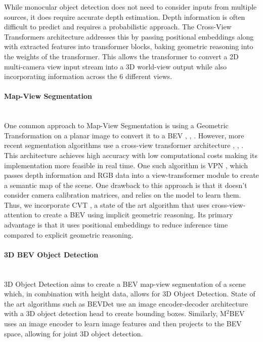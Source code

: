 \documentclass[a4paper,12pt]{article}
\newcommand{\sur}[1]{\ensuremath{^{\textrm{#1}}}} %
\begin{document}
\begin{multicols}{2}
While monocular object detection does not need to consider inputs from multiple sources, it does require accurate depth estimation. Depth information is often difficult to predict and requires a probabilistic approach.  The Cross-View Transformers architecture addresses this by passing positional embeddings along with extracted features into transformer blocks, baking geometric reasoning into the weights of the transformer. This allows the transformer to convert a 2D multi-camera view input stream into a 3D world-view output while also incorporating information across the 6 different views.

\paragraph{Map-View Segmentation}\mbox{}\\
One common approach to Map-View Segmentation is using a Geometric Transformation on a planar image to convert it to a BEV \cite{Geotrans}, \cite{GeoTrans2}, \cite{GeoTransform}. However, more recent segmentation algorithms use a cross-view transformer architecture \cite{VPN}, \cite{CVT}, \cite{BEVsemseg}. This architecture achieves high accuracy with low computational costs making its implementation more feasible in real time. One such algorithm is VPN \cite{VPN}, which passes depth information and RGB data into a view-transformer module to create a semantic map of the scene. One drawback to this approach is that it doesn't consider camera calibration matrices, and relies on the model to learn them. Thus, we incorporate CVT \cite{CVT}, a state of the art algorithm that uses cross-view-attention to create a BEV using implicit geometric reasoning. Its primary advantage is that it uses positional embeddings to reduce inference time compared to explicit geometric reasoning.

\paragraph{3D BEV Object Detection}\mbox{}\\
3D Object Detection aims to create a BEV map-view segmentation of a scene which, in combination with height data, allows for 3D Object Detection. State of the art algorithms such as BEVDet \cite{BEVdet} use an image encoder-decoder architecture with a 3D object detection head to create bounding boxes. Similarly, M\sur{2}BEV \cite{M2BEV} uses an image encoder to learn image features and then projects to the BEV space, allowing for joint 3D object detection.


\end{multicols}
\end{document}
